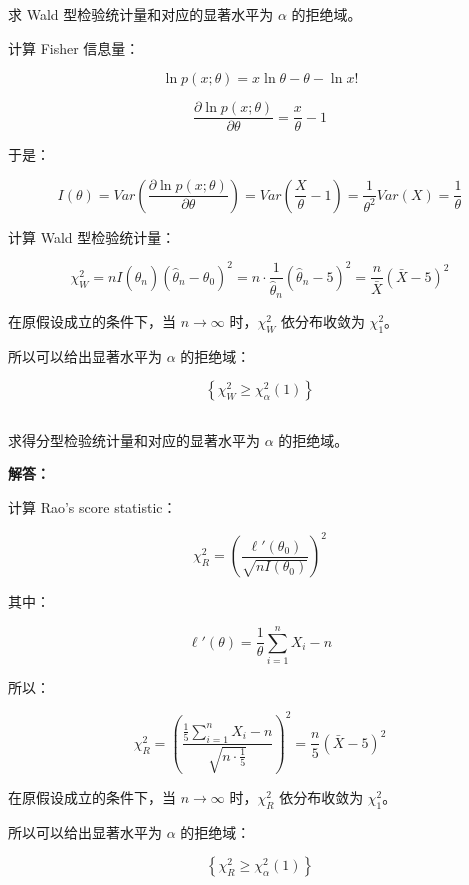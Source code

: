 \documentclass[12pt,a4paper]{article}
\begin{document}
求 Wald 型检验统计量和对应的显著水平为 $\alpha$ 的拒绝域。

\begin{answerbox}

计算 Fisher 信息量：

$$
\ln p(x; \theta) = x \ln \theta - \theta - \ln x!
$$

$$
\frac{\partial \ln p(x; \theta)}{\partial \theta} = \frac{x}{\theta} - 1
$$

于是：

$$
I(\theta) = Var\left(\frac{\partial \ln p(x; \theta)}{\partial \theta}\right) = Var\left(\frac{X}{\theta} - 1\right) = \frac{1}{\theta^2} Var(X) = \frac{1}{\theta}
$$

计算 Wald 型检验统计量：

$$
\chi^2_W = n I(\hat{\theta}_n)(\hat{\theta}_n - \theta_0)^2 = n \cdot \frac{1}{\hat{\theta}_n} (\hat{\theta}_n - 5)^2 = \frac{n}{\bar{X}} (\bar{X} - 5)^2
$$

在原假设成立的条件下，当 $n \to \infty$ 时，$\chi^2_W$ 依分布收敛为 $\chi^2_1$。

所以可以给出显著水平为 $\alpha$ 的拒绝域：

$$
\left\{\chi^2_W \geq \chi^2_{\alpha}(1)\right\}
$$
\end{answerbox}

\subsection{}

求得分型检验统计量和对应的显著水平为 $\alpha$ 的拒绝域。

\begin{answerbox}
\textbf{解答：}

计算 Rao's score statistic：

$$
\chi^2_R = \left(\frac{\ell'(\theta_0)}{\sqrt{nI(\theta_0)}}\right)^2 
$$

其中：

$$
\ell'(\theta) =  \frac{1}{\theta} \sum_{i=1}^n X_i - n
$$

所以：

$$
\chi^2_R = \left(\frac{\frac{1}{5} \sum_{i=1}^n X_i - n}{\sqrt{n \cdot \frac{1}{5}}}\right)^2 = \frac{n}{5} \left( \bar{X} - 5 \right)^2
$$

在原假设成立的条件下，当 $n \to \infty$ 时，$\chi^2_R$ 依分布收敛为 $\chi^2_1$。

所以可以给出显著水平为 $\alpha$ 的拒绝域：

$$
\left\{\chi^2_R \geq \chi^2_{\alpha}(1)\right\}
$$
\end{answerbox}
\end{document}
